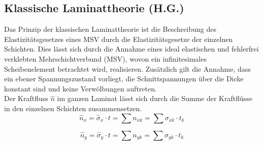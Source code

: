 \subsection{Klassische Laminattheorie (H.G.)}\label{CLT}
Das Prinzip der klassischen Laminattheorie ist die Beschreibung des Elastizitätsgesetzes eines MSV durch die Elastizitätsgesetze der einzelnen Schichten. Dies lässt sich durch die Annahme eines ideal elastischen und fehlerfrei verklebten Mehrschichtverbund (MSV), wovon ein infinitesimales Scheibenelement betrachtet wird, realisieren. Zusätzlich gilt die Annahme, dass ein ebener Spannungszustand vorliegt, die Schnittspannungen über die Dicke konstant sind und keine Verwölbungen auftreten.\\
\noindent
Der Kraftfluss $\hat{n}$ im ganzen Laminat lässt sich durch die Summe der Kraftflüsse in den einzelnen Schichten zusammensetzen.
\begin{equation}
\label{Kraftfluss}
\hat{n}_{x}=\hat{\sigma}_{x}\cdot t=\sum n_{xk}=\sum\sigma_{xk}\cdot t_{k}
\end{equation}

\begin{equation}
\hat{n}_{y}=\hat{\sigma}_{y}\cdot t=\sum n_{yk}=\sum\sigma_{yk}\cdot t_{k}
\end{equation}

